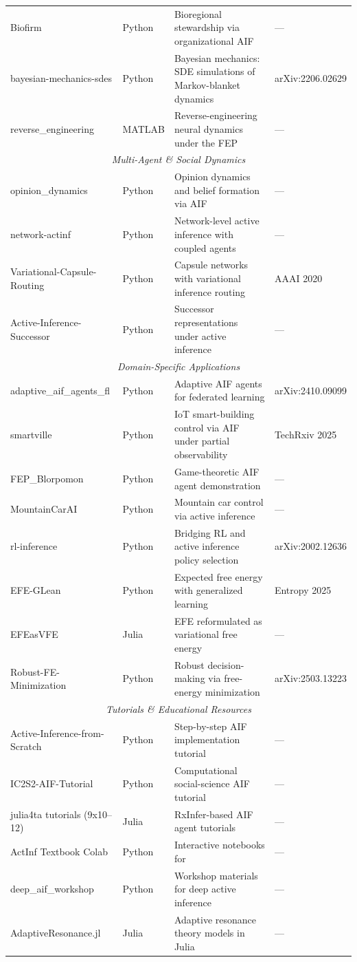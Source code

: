 \documentclass[
  english,
]{article}
\begin{document}
{{{{{{{{{{{{{{{{\begin{center}
\begin{longtable}{p{3.2cm} p{1.6cm} p{6.4cm} p{2.5cm}}
Biofirm & Python & Bioregional stewardship via organizational AIF & --- \\
bayesian-mechanics-sdes & Python & Bayesian mechanics: SDE simulations of Markov-blanket dynamics & arXiv:2206.02629 \\
reverse\_engineering & MATLAB & Reverse-engineering neural dynamics under the FEP & --- \\
\midrule
\multicolumn{4}{c}{\textit{Multi-Agent \& Social Dynamics}} \\
\midrule
opinion\_dynamics & Python & Opinion dynamics and belief formation via AIF & --- \\
network-actinf & Python & Network-level active inference with coupled agents & --- \\
Variational-Capsule-Routing & Python & Capsule networks with variational inference routing & AAAI 2020 \\
Active-Inference-Successor & Python & Successor representations under active inference & --- \\
\midrule
\multicolumn{4}{c}{\textit{Domain-Specific Applications}} \\
\midrule
adaptive\_aif\_agents\_fl & Python & Adaptive AIF agents for federated learning & arXiv:2410.09099 \\
smartville & Python & IoT smart-building control via AIF under partial observability & TechRxiv 2025 \\
FEP\_Blorpomon & Python & Game-theoretic AIF agent demonstration & --- \\
MountainCarAI & Python & Mountain car control via active inference & --- \\
rl-inference & Python & Bridging RL and active inference policy selection & arXiv:2002.12636 \\
EFE-GLean & Python & Expected free energy with generalized learning & Entropy 2025 \\
EFEasVFE & Julia & EFE reformulated as variational free energy & --- \\
Robust-FE-Minimization & Python & Robust decision-making via free-energy minimization & arXiv:2503.13223 \\
\midrule
\multicolumn{4}{c}{\textit{Tutorials \& Educational Resources}} \\
\midrule
Active-Inference-from-Scratch & Python & Step-by-step AIF implementation tutorial & --- \\
IC2S2-AIF-Tutorial & Python & Computational social-science AIF tutorial & --- \\
julia4ta tutorials (9x10--12) & Julia & RxInfer-based AIF agent tutorials & --- \\
ActInf Textbook Colab & Python & Interactive notebooks for \cite{parr2022active} & --- \\
deep\_aif\_workshop & Python & Workshop materials for deep active inference & --- \\
AdaptiveResonance.jl & Julia & Adaptive resonance theory models in Julia & --- \\
\end{longtable}
\end{center}

}}}}}}}}}}}}}}}}
\end{document}
